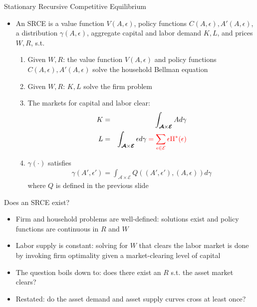 \documentclass[9pt]{beamer}
\newcommand{\bit}{\begin{itemize}}
\newcommand{\eit}{\end{itemize}}
\newcommand{\ben}{\begin{enumerate}}
\newcommand{\een}{\end{enumerate}}
\begin{document}
\begin{frame}{Stationary Recursive Competitive Equilibrium}

\bit
\setlength\itemsep{1.5em}

\item An SRCE is a value function $V(A, \epsilon)$, policy functions $C(A, \epsilon), A'(A, \epsilon)$, a distribution $\gamma(A,\epsilon)$, aggregate capital and labor demand $K, L$, and prices $W,R$, s.t.

\ben
\setlength\itemsep{1.5em}

\item Given $W,R$: the value function $V(A, \epsilon)$ and policy functions $C(A, \epsilon), A'(A, \epsilon)$ solve the household Bellman equation

\item Given $W,R$: $K, L$ solve the firm problem

\item The markets for capital and labor clear:
\begin{eqnarray}
K &=& \int_{\bm{\mathcal A} \times \bm{\mathcal E}} A d\gamma \nonumber \\
L &=& \int_{\bm{\mathcal A} \times \bm{\mathcal E}} \epsilon d\gamma \color{red} = \sum_{\epsilon \in \mathcal E} \epsilon \Pi^{*}(\epsilon) \nonumber
\end{eqnarray}

\item $\gamma(\cdot)$ satisfies
\begin{eqnarray}
\gamma(A', \epsilon') = \int_{\bm{\mathcal A} \times \bm{\mathcal E}} Q((A',\epsilon'), (A, \epsilon)) d\gamma \nonumber
\end{eqnarray}
where $Q$ is defined in the previous slide
\een
\eit

\end{frame}

\begin{frame}{Does an SRCE exist?}

\bit
\setlength\itemsep{2em}

\item Firm and household problems are well-defined: solutions exist and policy functions are continuous in $R$ and $W$

\item Labor supply is constant: solving for $W$ that clears the labor market is done by invoking firm optimality given a market-clearing level of capital

\item The question boils down to: does there exist an $R$ s.t. the asset market clears?

\item Restated: do the asset demand and asset supply curves cross at least once?

\eit

\end{frame}
\end{document}
